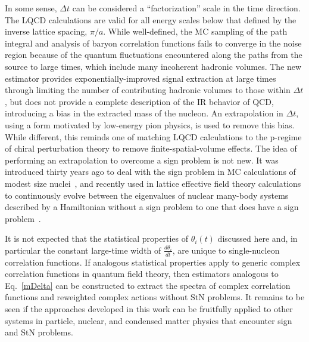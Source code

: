 In some sense, $\Delta t$ can be considered a ``factorization'' scale in the time direction.
The LQCD calculations are valid for all energy scales below that defined by the inverse lattice spacing, $\pi/a$.
While well-defined, the MC sampling of the path integral and analysis of baryon correlation functions
 fails to converge in the noise region because of the 
quantum fluctuations encountered along the paths from the source to large times, which include many incoherent hadronic volumes.
The new estimator provides exponentially-improved signal extraction at large times through limiting the number of 
contributing hadronic volumes to those within $\Delta t$, 
but  does not provide a complete description of the IR behavior of QCD, introducing a bias in the extracted mass of the nucleon.
An extrapolation in $\Delta t$, using a form motivated by low-energy pion physics, is used to remove this bias.
While  different, this reminds one of matching LQCD calculations to the p-regime of chiral perturbation theory to 
remove finite-spatial-volume effects.
The idea of performing an extrapolation to overcome a sign problem is not new.
It was introduced thirty years ago to deal with the sign problem in MC calculations of modest size nuclei~\cite{Alhassid:1993yd},
and recently used in lattice effective field theory calculations to continuously evolve between the eigenvalues of nuclear many-body systems
described by a Hamiltonian without a sign problem to one that does have a sign problem~\cite{Lahde:2015ona}.



It is not expected that the statistical properties of $\theta_i(t)$ discussed here and, 
in particular the constant large-time width of $\frac{d\theta_i}{dt}$, are unique to single-nucleon correlation functions. 
If analogous statistical properties apply to generic complex correlation functions in 
quantum field theory, then estimators analogous to Eq.~\eqref{mDelta} can be constructed to extract the spectra 
of complex correlation functions and reweighted complex actions without StN problems. 
It remains to be seen if the approaches developed in this work can be fruitfully applied to other systems in 
particle, nuclear, and condensed matter physics that encounter sign and StN problems.



